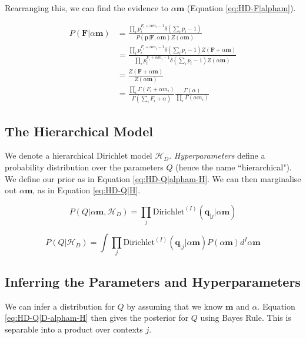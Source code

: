 \noindent Rearranging this, we can find the evidence to $\alpha\boldsymbol{m}$ (Equation \ref{eq:HD-F|alpham}).

\begin{align}
P(\boldsymbol{F}|\alpha\boldsymbol{m})&=\frac{\prod_{i}p_{i}^{F_{i}+\alpha m_{i}-1}\delta(\sum_{i}p_{i}-1)}{P(\boldsymbol{p}|\boldsymbol{F},\alpha\boldsymbol{m})Z(\alpha\boldsymbol{m})} \nonumber
\\
&=\frac{\prod_{i}p_{i}^{F_{i}+\alpha m_{i}-1}\delta(\sum_{i}p_{i}-1)Z(\boldsymbol{F}+\alpha\boldsymbol{m})}{\prod_{i}p_{i}^{F_{i}+\alpha m_{i}-1}\delta(\sum_{i}p_{i}-1)Z(\alpha\boldsymbol{m})} \nonumber
\\
&=\frac{Z(\boldsymbol{F}+\alpha\boldsymbol{m})}{Z(\alpha\boldsymbol{m})} \nonumber
\\
&=\frac{\prod_{i}\Gamma(F_{i}+\alpha m_{i})}{\Gamma(\sum_{i}F_{i}+\alpha)}\frac{\Gamma(\alpha)}{\prod_{i}\Gamma(\alpha m_{i})}
\label{eq:HD-F|alpham}
\end{align}

\subsection{The Hierarchical Model}

We denote a hierarchical Dirichlet model $\mathscr{H}_{D}$. \textit{Hyperparameters} define a probability distribution over the parameters $Q$ (hence the name ``hierarchical"). We define our prior as in Equation \ref{eq:HD-Q|alpham-H}. We can then marginalise out $\alpha\boldsymbol{m}$, as in Equation \ref{eq:HD-Q|H}.

\begin{equation}
P(Q|\alpha\boldsymbol{m},\mathscr{H}_{D})=\prod_{j}\text{Dirichlet}^{(I)}(\boldsymbol{q}_{|j}|\alpha\boldsymbol{m})
\label{eq:HD-Q|alpham-H}
\end{equation}

\begin{equation}
P(Q|\mathscr{H}_{D})=\int\prod_{j}\text{Dirichlet}^{(I)}(\boldsymbol{q}_{|j}|\alpha\boldsymbol{m})P(\alpha\boldsymbol{m})d^{I}\alpha\boldsymbol{m}
\label{eq:HD-Q|H}
\end{equation}

\subsection{Inferring the Parameters and Hyperparameters}

We can infer a distribution for $Q$ by assuming that we know $\boldsymbol{m}$ and $\alpha$. Equation \ref{eq:HD-Q|D-alpham-H} then gives the posterior for $Q$ using Bayes Rule. This is separable into a product over contexts $j$.

